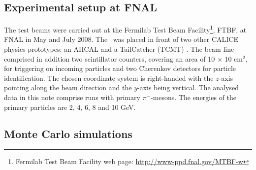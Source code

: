 \subsection{Experimental setup at FNAL}\label{sec:fnal}
The test beams were carried out at the Fermilab Test Beam Facility\footnote{\label{note1}Fermilab Test Beam Facility web page: \url{http://www-ppd.fnal.gov/MTBF-w}}, FTBF, at FNAL in May and July 2008.
The \ecal\ was placed in front of two other CALICE physics prototypes: an AHCAL \cite{collaboration:2010hb} and a TailCatcher (TCMT) \cite{CALICE:2012aa}.
The beam-line comprised in addition two scintillator counters, covering an area of 10 $\times$ 10 cm$^2$, for triggering on incoming particles and two Cherenkov detectors for particle identification.
The chosen coordinate system is right-handed with the $z$-axis pointing along the beam direction and the $y$-axis being vertical.
The analysed data in this note comprise runs with primary $\pi^-$-mesons. The energies of the primary particles are 2, 4, 6, 8 and 10 GeV.

\subsection{Monte Carlo simulations}

